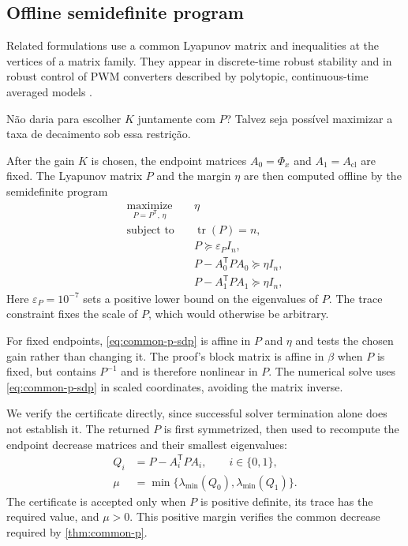 \documentclass[pdflatex,iicol,sn-mathphys-ay]{sn-jnl}
\newcommand{\red}[1]{{\color{red}#1}}
\begin{document}
\subsection{Offline semidefinite program}

Related formulations use a common Lyapunov matrix and inequalities at the vertices of a matrix family. They appear in discrete-time robust stability \cite{deOliveira1999lmiDiscrete} and in robust control of PWM converters described by polytopic, continuous-time averaged models \cite{olalla2009robustLqrPwm}.

\red{Não daria para escolher $K$ juntamente com $P$? Talvez seja possível maximizar a taxa de decaimento sob essa restrição.}

After the gain $K$ is chosen, the endpoint matrices $A_0=\Phi_x$ and $A_1=A_{\mathrm{cl}}$ are fixed. The Lyapunov matrix $P$ and the margin $\eta$ are then computed offline by the semidefinite program
\begin{equation}
\begin{aligned}
    \underset{P=P^{\mathsf T},\,\eta}{\operatorname{maximize}}\quad&\eta\\
    \text{subject to}\quad
    &\operatorname{tr}(P)=n,\\
    &P\succeq\varepsilon_P I_n,\\
    &P-A_0^{\mathsf T}PA_0\succeq\eta I_n,\\
    &P-A_1^{\mathsf T}PA_1\succeq\eta I_n,
\end{aligned}
\label{eq:common-p-sdp}
\end{equation}
Here $\varepsilon_P=10^{-7}$ sets a positive lower bound on the eigenvalues of $P$. The trace constraint fixes the scale of $P$, which would otherwise be arbitrary.

For fixed endpoints, \eqref{eq:common-p-sdp} is affine in $P$ and $\eta$ and tests the chosen gain rather than changing it. The proof's block matrix is affine in $\beta$ when $P$ is fixed, but contains $P^{-1}$ and is therefore nonlinear in $P$. The numerical solve uses \eqref{eq:common-p-sdp} in scaled coordinates, avoiding the matrix inverse.

We verify the certificate directly, since successful solver termination alone does not establish it. The returned $P$ is first symmetrized, then used to recompute the endpoint decrease matrices and their smallest eigenvalues:
\begin{equation}
\begin{aligned}
    Q_i&=P-A_i^{\mathsf T}PA_i,\qquad i\in\{0,1\},\\
    \mu&=\min\{\lambda_{\min}(Q_0),\lambda_{\min}(Q_1)\}.
\end{aligned}
\label{eq:verified-margin}
\end{equation}
The certificate is accepted only when $P$ is positive definite, its trace has the required value, and $\mu>0$. This positive margin verifies the common decrease required by \cref{thm:common-p}.
\end{document}
